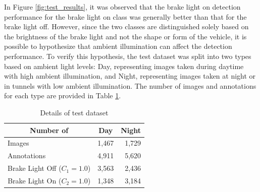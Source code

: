In Figure \ref{fig:test_results}, it was observed that the brake light on detection performance for the brake light on class was generally better than that for the brake light off.
However, since the two classes are distinguished solely based on the brightness of the brake light and not the shape or form of the vehicle, it is possible to hypothesize that ambient illumination can affect the detection performance. 
To verify this hypothesis, the test dataset was split into two types based on ambient light levels: Day, representing images taken during daytime with high ambient illumination, and Night, representing images taken at night or in tunnels with low ambient illumination.
The number of images and annotations for each type are provided in Table \ref{tab:test_dataset}.

\begin{table}[h]
    \caption{Details of test dataset}
    \label{tab:test_dataset}
    \begin{tabular}{p{5cm} p{5cm} p{5cm}}
    \toprule
    \multicolumn{1}{c}{Number of}                          & \multicolumn{1}{c}{Day} & \multicolumn{1}{c}{Night} \\
    \midrule
    Images                              & \multicolumn{1}{r}{1,467}                     & \multicolumn{1}{r}{1,729}                    \\
    Annotations                         & \multicolumn{1}{r}{4,911}                    & \multicolumn{1}{r}{5,620}                   \\
    \multicolumn{1}{c}{Brake Light Off ($C_{1}=1.0$)} & \multicolumn{1}{r}{3,563}                    & \multicolumn{1}{r}{2,436}                    \\
    \multicolumn{1}{c}{Brake Light On ($C_{2}=1.0$)}  & \multicolumn{1}{r}{1,348}                     & \multicolumn{1}{r}{3,184}                   \\
    \bottomrule
    \end{tabular}%
\end{table}

